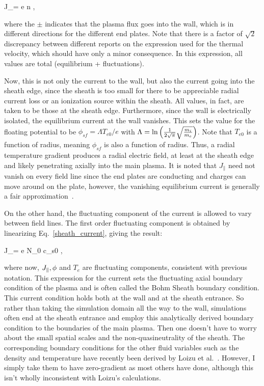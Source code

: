 \beq
\label{sheath_current}
J_\parallel = \pm e n ,
\eeq

where the $\pm$ indicates that the plasma flux goes into the wall, which is in different directions for the different end plates.
Note that there is a factor of $\sqrt{2}$ discrepancy between different reports on the expression used for the thermal velocity, which should have only a minor consequence.
In this expression, all values are total (equilibrium + fluctuations).

Now, this is not only the current to the wall, but also the current going into the sheath edge, since the sheath is too small for there to be appreciable radial current loss or an ionization source
within the sheath. All values, in fact, are taken to be those at the sheath edge.
Furthermore, since the wall is electrically isolated, the equilibrium current at the wall vanishes.
This sets the value for the floating potential to be $\phi_{sf} = \Lambda T_{e0} / e$ with $\Lambda = {\rm ln} \left(\frac{1}{2 \sqrt{\pi}} \sqrt{\frac{m_i}{m_e}} \right)$.
Note that $T_{e0}$ is a function of radius, meaning $\phi_{sf}$ is also a function of radius. Thus, a radial temperature gradient produces a radial
electric field, at least at the sheath edge and likely penetrating axially into the main plasma. 
It is noted that $J_\parallel$ need not vanish on every field line since the end plates are conducting and charges can move around on the plate, 
however, the vanishing equilibrium current is generally a fair approximation~\cite{berk1993}.

On the other hand, the fluctuating component of the current is allowed to vary between field lines.
The first order fluctuating component is obtained by linearizing Eq.~\ref{sheath_current}, giving the result:

\beq
\label{lin_sheath_current}
J_\parallel = \pm e N_0 c_{s0} ,
\eeq

where now, $J_\parallel, \phi$ and $T_e$ are fluctuating components, consistent with previous notation.
This expression for the current sets the fluctuating axial boundary condition of the plasma and is often called the Bohm Sheath boundary condition. This current condition holds both at
the wall and at the sheath entrance. So rather than taking the simulation
domain all the way to the wall, simulations often end at the sheath entrance and employ this analytically derived boundary condition to the boundaries of the main plasma. 
Then one doesn't have to worry about the small spatial scales and the non-quasineutrality of the sheath.
The corresponding boundary conditions for the other fluid variables such as the density and temperature have recently been derived by Loizu et al.~\cite{loizu2012}. However, I
simply take them to have zero-gradient as most others have done, although this isn't wholly inconsistent with Loizu's calculations.

